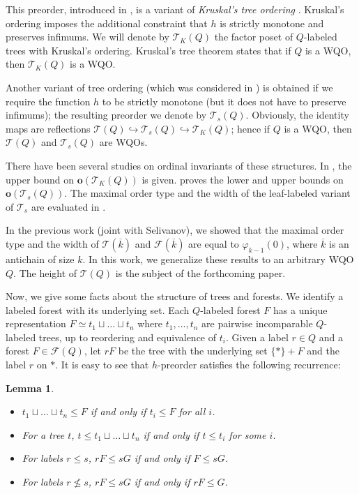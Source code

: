 \documentclass[10pt,a4paper]{amsart}
\let \leq \leqslant
\let \nleq \nleqslant
\let \phi \varphi
\let \embeds \hookrightarrow
\def \T {\mathcal{T}}
\def \F {\mathcal{F}}
\def \o {\textbf{o}}
\newtheorem{lemma}{Lemma}
\begin{document}
This preorder, introduced in \cite{Selivanov2011}, is a variant of \textit{Kruskal's tree ordering} \cite{Kruskal1960}. Kruskal's ordering imposes the additional constraint that $h$ is strictly monotone and preserves infimums. We will denote by $\T_K(Q)$ the factor poset of $Q$-labeled trees with Kruskal's ordering. Kruskal's tree theorem states that if $Q$ is a WQO, then $\T_K(Q)$ is a WQO.

Another variant of tree ordering (which was considered in \cite{Montalban2017,Friedman2023}) is obtained if we require the function $h$ to be strictly monotone (but it does not have to preserve infimums); the resulting preorder we denote by $\T_s(Q)$. Obviously, the identity maps are reflections $\T(Q) \embeds \T_s(Q) \embeds \T_K(Q)$; hence if $Q$ is a WQO, then $\T(Q)$ and $\T_s(Q)$ are WQOs.

There have been several studies on ordinal invariants of these structures. In \cite{Schmidt2020}, the upper bound on $\o(\T_K(Q))$ is given. \cite{Friedman2023} proves the lower and upper bounds on $\o(\T_s(Q))$. The maximal order type and the width of the leaf-labeled variant of $\T_s$ are evaluated in \cite{Chopra2026}.

In the previous work \cite{Selivanov2025} (joint with Selivanov), we showed that the maximal order type and the width of $\T\left(\overline{k}\right)$ and $\F\left(\overline{k}\right)$ are equal to $\phi_{k-1}(0)$, where $\overline{k}$ is an antichain of size $k$. In this work, we generalize these results to an arbitrary WQO $Q$. The height of $\T(Q)$ is the subject of the forthcoming paper.

Now, we give some facts about the structure of trees and forests. We identify a labeled forest with its underlying set. Each $Q$-labeled forest $F$ has a unique representation $F \simeq t_1 \sqcup \dots \sqcup t_n$ where $t_1,\dots,t_n$ are pairwise incomparable $Q$-labeled trees, up to reordering and equivalence of $t_i$. Given a label $r \in Q$ and a forest $F \in \F(Q)$, let $rF$ be the tree with the underlying set $\{*\}+F$ and the label $r$ on $*$. It is easy to see that $h$-preorder satisfies the following recurrence:

\begin{lemma}
    \begin{itemize}
        \item $t_1 \sqcup \dots \sqcup t_n \leq F$ if and only if $t_i \leq F$ for all $i$.
        \item For a tree $t$, $t \leq t_1 \sqcup \dots \sqcup t_n$ if and only if $t \leq t_i$ for some $i$.
        \item For labels $r \leq s$, $r F \leq s G$ if and only if $F \leq s G$.
        \item For labels $r \nleq s$, $r F \leq s G$ if and only if $r F \leq G$.
    \end{itemize}
\end{lemma}
\end{document}
